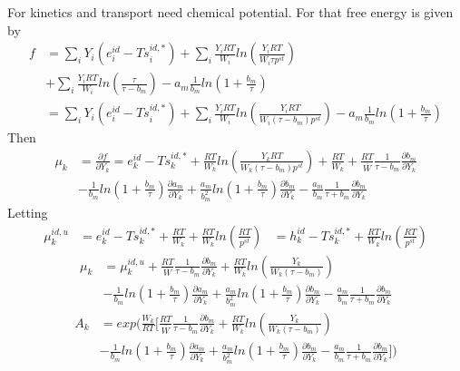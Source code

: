\documentclass[11pt]{article}
\newcommand{\wbar}{\overline{W}}
\begin{document}
For kinetics and transport need chemical potential. For that free energy is given by
\begin{align}
f &= \sum_i Y_i (e_i^{id} - T s_i^{id,*}) +  \sum_i \frac{Y_i R T}{W_i} ln (\frac{Y_i R T}{W_i \tau p^{st}})  \nonumber \\
&+ \sum_i \frac{Y_i R T}{W_i} ln (\frac{\tau}{\tau-b_m}) -  a_m \frac{1}{b_m}
ln (1+ \frac{b_m}{\tau})  \nonumber \\
 &= \sum_i Y_i (e_i^{id} - T s_i^{id,*}) +  \sum_i \frac{Y_i R T}{W_i} ln (\frac{Y_i R T}{W_i (\tau-b_m) p^{st}} )
- a_m \frac{1}{b_m}
ln (1+ \frac{b_m}{\tau})  \nonumber 
\end{align}
Then
\begin{align}
\mu_k &= \frac{\partial f}{\partial Y_k} = 
e_k^{id} - T s_k^{id,*}  + \frac{RT}{W_k} ln (\frac{Y_k R T}{W_k (\tau-b_m) p^{st}})
+ \frac{RT}{W_k} +  \frac{RT}{\wbar} \frac{1}{\tau-b_m} \frac {\partial b_m}{\partial Y_k} \nonumber \\
&- \frac{1}{b_m} ln(1 + \frac{b_m}{\tau}) \frac{\partial a_m}{\partial Y_k}
+ \frac{a_m}{b_m^2} ln(1 + \frac{b_m}{\tau}) \frac{\partial b_m}{\partial Y_k}
- \frac{a_m}{b_m} \frac{1}{\tau+b_m} \frac{\partial b_m}{\partial Y_k}
\end{align}
Letting
\begin{align}
\mu_k^{id,u} &=  e_k^{id} - T s_k^{id,*} + \frac{RT}{W_k}+ \frac{R T}{W_k} ln( \frac{RT}{p^{st}})
 &=  h_k^{id} - T s_k^{id,*} + \frac{R T}{W_k} ln( \frac{RT}{p^{st}})
\end{align}
\begin{align}
\mu_k &= \mu_k^{id,u} + \frac{RT}{\wbar} \frac{1}{\tau-b_m} \frac {\partial b_m}{\partial Y_k}
+ \frac {RT}{W_k} ln ( \frac{Y_k}{W_k (\tau-b_m)}) \nonumber \\
&- \frac{1}{b_m} ln(1 + \frac{b_m}{\tau}) \frac{\partial a_m}{\partial Y_k}
+ \frac{a_m}{b_m^2} ln(1 + \frac{b_m}{\tau}) \frac{\partial b_m}{\partial Y_k}
- \frac{a_m}{b_m} \frac{1}{\tau+b_m} \frac{\partial b_m}{\partial Y_k}
\end{align}
\begin{align}
A_k &=  exp  (  \frac{W_k}{RT}   [
\frac{RT}{\wbar} \frac{1}{\tau-b_m} \frac {\partial b_m}{\partial Y_k}
+ \frac {RT}{W_k} ln ( \frac{Y_k}{W_k (\tau-b_m)}) \nonumber \\
&- \frac{1}{b_m} ln(1 + \frac{b_m}{\tau}) \frac{\partial a_m}{\partial Y_k}
+ \frac{a_m}{b_m^2} ln(1 + \frac{b_m}{\tau}) \frac{\partial b_m}{\partial Y_k}
- \frac{a_m}{b_m} \frac{1}{\tau+b_m} \frac{\partial b_m}{\partial Y_k} ] )
\end{align}
\end{document}
